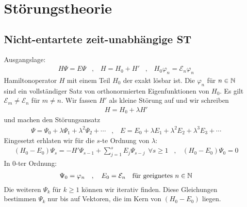 \section{Störungstheorie}

\subsection{Nicht-entartete zeit-unabhängige ST}

Ausgangslage:
\begin{align*}
    H \Psi = E \Psi
    \hspace{10pt} , \hspace{10pt}
    H = H_0 + H'
    \hspace{10pt} , \hspace{10pt}
    H_0 \varphi_n = \mathcal{E}_n \varphi_n
\end{align*}
Hamiltonoperator $H$ mit einem Teil $H_0$ der exakt lösbar ist. Die $\varphi_n$ für
$n \in \mathbb{N}$ sind ein vollständiger Satz von orthonormierten Eigenfunktionen von
$H_0$. Es gilt $\mathcal{E}_m \neq \mathcal{E}_n$ für $m \neq n$. Wir fassen
$H'$ als kleine Störung auf und wir schreiben
\begin{align*}
    H = H_0 + \lambda H'
\end{align*}
und machen den Störungsansatz
\begin{align*}
    \Psi = \Psi_0 + \lambda \Psi_1 + \lambda^2 \Psi_2 + \dotsb
    \hspace{10pt} , \hspace{10pt}
    E = E_0 + \lambda E_1 + \lambda^2 E_2 + \lambda^3 E_3 + \dotsb
\end{align*}
Eingesetzt erhlaten wir für die $s$-te Ordnung von $\lambda$:
\begin{align*}
    (H_0 - E_0) \Psi_s = - H' \Psi_{s-1} + \sum_{j=1}^s E_j \Psi_{s-j}
    \ \ \forall s \geq 1
    \hspace{10pt} , \hspace{10pt}
    (H_0 - E_0) \Psi_0 = 0
\end{align*}
In $0$-ter Ordnung:
\begin{align*}
    \Psi_0 = \varphi_n
    \hspace{10pt} , \hspace{10pt}
    E_0 = \mathcal{E}_n
    \hspace{10pt}
    \text{für geeignetes $n \in \mathbb{N}$}
\end{align*}
Die weiteren $\Psi_k$ für $k \geq 1$ können wir iterativ finden. Diese Gleichungen
bestimmen $\Psi_k$ nur bis auf Vektoren, die im Kern von $(H_0 - E_0)$ liegen.
